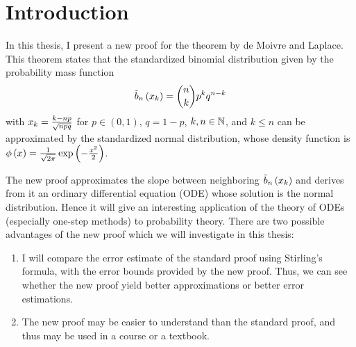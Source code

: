 \chapter{Introduction}

In this thesis, I present a new proof for the theorem by de Moivre and Laplace. This theorem states that the standardized binomial distribution given by the probability mass function
\begin{align}
  \bb{\x} = \binom nk p^k q^{n-k}
\end{align}
with $\x[k] = \frac{k-np}{\sqrt{npq}}$ for $p\in (0,1)$, $q=1-p$, $k,n\in\N$, and $k\le n$ can be approximated by the standardized normal distribution, whose density function is $\fphi{x} = \frac{1}{\sqrt {2\pi}} \fexp{-\frac{x^2}2}$.

The new proof approximates the slope between neighboring $\bb{\x}$ and derives from it an ordinary differential equation (ODE) whose solution is the normal distribution. Hence it will give an interesting application of the theory of ODEs (especially one-step methods) to probability theory. There are two possible advantages of the new proof which we will investigate in this thesis:

\begin{enumerate}
  \item I will compare the error estimate of the standard proof using Stirling's formula, with the error bounds provided by the new proof. Thus, we can see whether the new proof yield better approximations or better error estimations.

  \item The new proof may be easier to understand than the standard proof, and thus may be used in a course or a textbook.
\end{enumerate}
